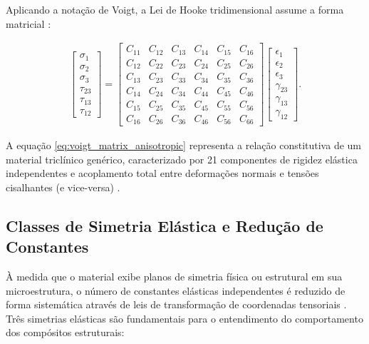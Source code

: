 Aplicando a notação de Voigt, a Lei de Hooke tridimensional assume a forma matricial \cite{Sadd2009}:

\begin{equation}
  \begin{aligned}
    \begin{bmatrix}
  \sigma_1 \\
  \sigma_2 \\
  \sigma_3 \\
  \tau_{23} \\
  \tau_{13} \\
  \tau_{12}
\end{bmatrix} = \begin{bmatrix}
  C_{11} & C_{12} & C_{13} & C_{14} & C_{15} & C_{16} \\
  C_{12} & C_{22} & C_{23} & C_{24} & C_{25} & C_{26} \\
  C_{13} & C_{23} & C_{33} & C_{34} & C_{35} & C_{36} \\
  C_{14} & C_{24} & C_{34} & C_{44} & C_{45} & C_{46} \\
  C_{15} & C_{25} & C_{35} & C_{45} & C_{55} & C_{56} \\
  C_{16} & C_{26} & C_{36} & C_{46} & C_{56} & C_{66}
\end{bmatrix} \begin{bmatrix}
  \epsilon_1 \\
  \epsilon_2 \\
  \epsilon_3 \\
  \gamma_{23} \\
  \gamma_{13} \\
  \gamma_{12}
\end{bmatrix}.
  \end{aligned}
  \label{eq:voigt_matrix_anisotropic}
\end{equation}

A equação \eqref{eq:voigt_matrix_anisotropic} representa a relação constitutiva de um material triclínico genérico, caracterizado por 21 componentes de rigidez elástica independentes e acoplamento total entre deformações normais e tensões cisalhantes (e vice-versa) \cite{Sadd2009}.

\subsection{Classes de Simetria Elástica e Redução de Constantes}

À medida que o material exibe planos de simetria física ou estrutural em sua microestrutura, o número de constantes elásticas independentes é reduzido de forma sistemática através de leis de transformação de coordenadas tensoriais \cite{lai2010continuum}. Três simetrias elásticas são fundamentais para o entendimento do comportamento dos compósitos estruturais:

